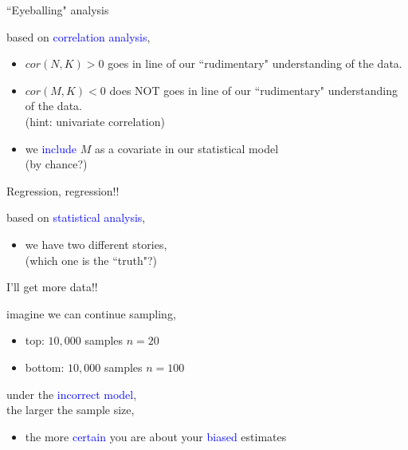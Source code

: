%
%
\begin{lhframe}[rhgraphic={\texttt{[image: fork3\_panel.pdf]}}]
	{``Eyeballing" analysis}
	
	based on \textcolor{blue}{correlation analysis},
	\begin{itemize}
		\item $cor(N, K)>0$ goes in line of our ``rudimentary" understanding of the data.
		\item $cor(M, K)<0$ does NOT goes in line of our ``rudimentary" understanding of the data. \\
		{\small (hint: univariate correlation)}
		\item we \textcolor{blue}{include} $M$ as a covariate in our statistical model \\
		{\small (by chance?)}
	\end{itemize}
\end{lhframe}
%
%
\begin{lhframe}[rhgraphic={\texttt{[image: fork3\_reg.png]}}]
	{Regression, regression!!}
	
	based on \textcolor{blue}{statistical analysis},
	\begin{itemize}
		\item we have two different stories, \\
		{\small (which one is the ``truth"?)}
	\end{itemize}
\end{lhframe}
%
%
\begin{lhframe}[rhgraphic={\texttt{[image: fork3\_samplesize.pdf]}}]
	{I'll get more data!!}
	
	imagine we can continue sampling,
	\begin{itemize}
		\item top: $10,000$ samples $n=20$
		\item bottom: $10,000$ samples $n=100$
	\end{itemize}
	
	under the \textcolor{blue}{incorrect model}, \\
	the larger the sample size,
	\begin{itemize}
		\item the more \textcolor{blue}{certain} you are about your \textcolor{blue}{biased} estimates
	\end{itemize}
\end{lhframe}
%
%
